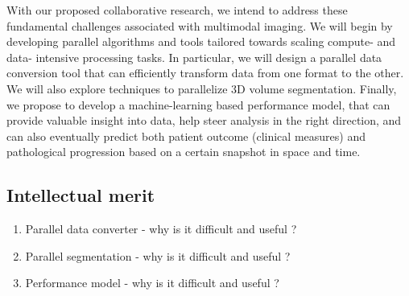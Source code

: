 \documentclass[11pt]{article}
\begin{document}
With our proposed collaborative research, we intend to address these fundamental challenges associated with multimodal imaging.
We will begin by developing parallel algorithms and tools tailored towards scaling compute- and data- intensive processing tasks. 
In particular, we will design a parallel data conversion tool that can efficiently transform data from one format to the other.
We will also explore techniques to parallelize 3D volume segmentation.
Finally, we propose to develop a machine-learning based performance model, that can provide valuable insight into data, help steer analysis in the right direction, and can also eventually 
predict both patient outcome (clinical measures) and pathological progression based on a certain snapshot in space and time.

\subsection{Intellectual merit}
\begin{enumerate}
	\setlength\itemsep{-0.2em}
	\item Parallel data converter - why is it difficult and useful ?
	\item Parallel segmentation -  why is it difficult and useful ?
	\item Performance model -  why is it difficult and useful ?
\end{enumerate}

\end{document}
